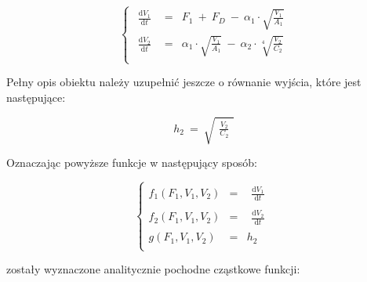 \documentclass[a4paper,12pt]{article}
\begin{document}
\begin{equation}
   \left\lbrace
   \begin{array}{rcl}
      \begin{matrix}\frac{\text{d}V_1}{\text{d}t}\end{matrix} & = & F_1 ~+~ F_D ~-~ \alpha_1\cdot\sqrt{\frac{V_1}{A_1}}\\[0.1cm]
      \begin{matrix}\frac{\text{d}V_2}{\text{d}t}\end{matrix} & = & \alpha_1\cdot\sqrt{\frac{V_1}{A_1}} ~-~ \alpha_2\cdot\sqrt[4]{\frac{V_2}{C_2}}\\[0.1cm]
   \end{array}
   \right.
\end{equation}

\noindent Pełny opis obiektu należy uzupełnić jeszcze o równanie wyjścia, które jest następujące:

\begin{equation}
   h_2 ~=~ \sqrt{ \begin{matrix} \frac{V_2}{C_2} \end{matrix} }
\end{equation}

\noindent Oznaczając powyższe funkcje w następujący sposób:

\begin{equation}
   \left\lbrace
   \begin{array}{rcl}
      f_1(F_1, V_1, V_2) & = & \begin{matrix}\frac{\text{d}V_1}{\text{d}t}\end{matrix} \\[0.1cm]
      f_2(F_1, V_1, V_2) & = & \begin{matrix}\frac{\text{d}V_2}{\text{d}t}\end{matrix} \\[0.1cm]
      g(F_1, V_1, V_2) & = & h_2 \\[0.1cm]
   \end{array}
   \right.
\end{equation}

\noindent zostały wyznaczone analitycznie pochodne cząstkowe funkcji:
\end{document}
